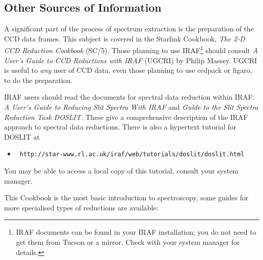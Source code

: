 \documentclass[twoside,11pt]{article}
\newcommand{\htmladdnormallink}[2]{#1}
\newcommand{\htmlref}[2]{#1}
\newcommand{\xref}[3]{#1}
\newcommand{\xlabel}[1]{}
\newcommand{\mlabel}[1]{\xlabel{#1}\label{#1}}
\newcommand{\scspec}[2]{#1}
\newcommand{\scspec}[2]{#2}
\begin{document}
\subsection{\mlabel{other_sources}Other Sources of Information}

A significant part of the process of spectrum extraction
is the preparation of the \htmlref{CCD}{gl_ccd} data frames.
This subject is covered in the Starlink Cookbook,
\xref{{\sl The 2-D CCD Reduction Cookbook} (SC/5)}{sc5}{}.
Those planning to use
\htmladdnormallink{IRAF}
{http://star-www.rl.ac.uk/iraf/web/iraf-homepage.html}\scspec{\footnote{IRAF
documents can be found in your IRAF installation; you
do not need to get them from Tucson or a mirror.  Check with your
system manager for
details.}}{{\bf (All IRAF-related hyperlinks in this document are to the
UK-based Starlink IRAF mirror except \htmladdnormallink{this one}
{http://iraf.noao.edu/} which goes to the Tucson site.)}} should consult
\htmladdnormallink{{\sl A User's Guide to CCD Reductions with IRAF}}
{ftp://starlink-ftp.rl.ac.uk/pub/iraf/iraf/docs/ccduser2.ps.Z} (UGCRI) by
Philip Massey.
UGCRI is useful to {\em any} user of CCD data, even those
planning to use \xref{{\sc ccdpack}}{sun139}{}\cite{ccdpack} or
\xref{{\sc figaro}}{sun86}{}\cite{figaro}, to do the preparation.

IRAF users should read the documents for spectral data reduction
within IRAF:
\htmladdnormallink{{\sl A User's Guide to Reducing Slit Spectra With IRAF}}
{ftp://starlink-ftp.rl.ac.uk/pub/iraf/iraf/docs/spect.ps.Z}
and
\htmladdnormallink{{\sl Guide to the Slit Spectra Reduction Task DOSLIT\@.}}
{ftp://starlink-ftp.rl.ac.uk/pub/iraf/iraf/docs/doslit.ps.Z}
These give a comprehensive description of the IRAF approach to spectral
data reductions.  There is also a hypertext tutorial for DOSLIT at

\begin{itemize}

\item \htmladdnormallink{{\tt
      http://star-www.rl.ac.uk/iraf/web/tutorials/doslit/doslit.html}}
      {http://star-www.rl.ac.uk/iraf/web/tutorials/doslit/doslit.html}

\end{itemize}

You may be able to access a local copy of this tutorial, consult your
system manager.

This Cookbook is the most basic introduction to spectroscopy, some
guides for more specialised types of reductions are available:
\end{document}
